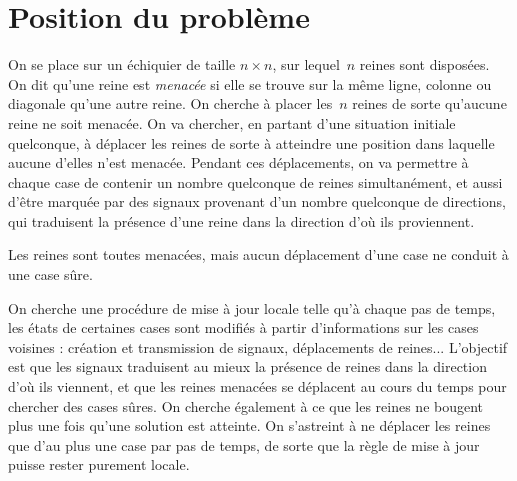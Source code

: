 \section{Position du problème}
\label{sec:intronreines}



On se place sur un échiquier de  taille $n \times n$, sur lequel~$n$ reines sont
disposées. On dit qu'une reine est  \emph{menacée} si elle se trouve sur la même
ligne,  colonne ou diagonale  qu'une autre  reine. On  cherche à  placer les~$n$
reines de sorte qu'aucune reine ne soit menacée.
On va chercher,  en partant d'une situation initiale  quelconque, à déplacer les
reines  de sorte à  atteindre une  position dans  laquelle aucune  d'elles n'est
menacée. Pendant ces déplacements, on va  permettre à chaque case de contenir un
nombre  quelconque de  reines simultanément,  et  aussi d'être  marquée par  des
signaux  provenant  d'un nombre  quelconque  de  directions,  qui traduisent  la
présence d'une reine dans la direction d'où ils proviennent. %


\begin{floatingfigure}[r]{.5\textwidth}
\centering
\newgame
{}
\notationoff
\showboard
\caption{Les reines sont toutes menacées, mais aucun déplacement d'une case ne conduit à une case sûre.}
\label{fig:blocage}
\end{floatingfigure} 
On cherche une procédure de mise à jour locale telle qu'à chaque pas
de temps, les états de certaines cases sont modifiés à partir d'informations sur
les  cases voisines  :  création  et transmission  de  signaux, déplace\-ments  de
reines... L'objectif est que  les signaux  tradui\-sent au  mieux la  présence de reines  dans la  direction d'où  ils vien\-nent,  et que  les reines
menacées  se déplacent  au cours  du  temps pour  chercher des  cases sûres.  On
cherche également à  ce que les reines ne bougent plus  une fois qu'une solution
est atteinte. On s'astreint à ne déplacer les reines  que d'au plus une case par pas de temps,
de sorte que la règle de mise  à jour puisse rester purement locale.

